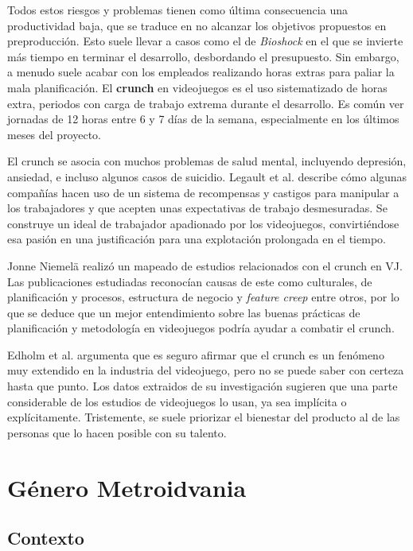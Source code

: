 Todos estos riesgos y problemas tienen como última consecuencia una productividad baja, que se traduce en no alcanzar los objetivos propuestos en preproducción. Esto suele llevar a casos como el de \textit{Bioshock} en el que se invierte más tiempo en terminar el desarrollo, desbordando el presupuesto. Sin embargo, a menudo suele acabar con los empleados realizando horas extras para paliar la mala planificación. El \textbf{crunch} en videojuegos es el uso sistematizado de horas extra, periodos con carga de trabajo extrema durante el desarrollo. Es común ver jornadas de 12 horas entre 6 y 7 días de la semana, especialmente en los últimos meses del proyecto.

El crunch se asocia con muchos problemas de salud mental, incluyendo depresión, ansiedad\cite{anderson}, e incluso algunos casos de suicidio\cite{kotakusuicide}. Legault et al.\cite{legault} describe cómo algunas compañías hacen uso de un sistema de recompensas y castigos para manipular a los trabajadores y que acepten unas expectativas de trabajo desmesuradas. Se construye un ideal de trabajador apadionado por los videojuegos, convirtiéndose esa pasión en una justificación para una explotación prolongada en el tiempo.

Jonne Niemelä\cite{nimela} realizó un mapeado de estudios relacionados con el crunch en VJ. Las publicaciones estudiadas reconocían causas de este como culturales, de planificación y procesos, estructura de negocio y \textit{feature creep} entre otros, por lo que se deduce que un mejor entendimiento sobre las buenas prácticas de planificación y metodología en videojuegos podría ayudar a combatir el crunch.

Edholm et al.\cite{edholm} argumenta que es seguro afirmar que el crunch es un fenómeno muy extendido en la industria del videojuego, pero no se puede saber con certeza hasta que punto. Los datos extraidos de su investigación sugieren que una parte considerable de los estudios de videojuegos lo usan, ya sea implícita o explícitamente. Tristemente, se suele priorizar el bienestar del producto al de las personas que lo hacen posible con su talento.

\section{Género Metroidvania}

\subsection{Contexto}

